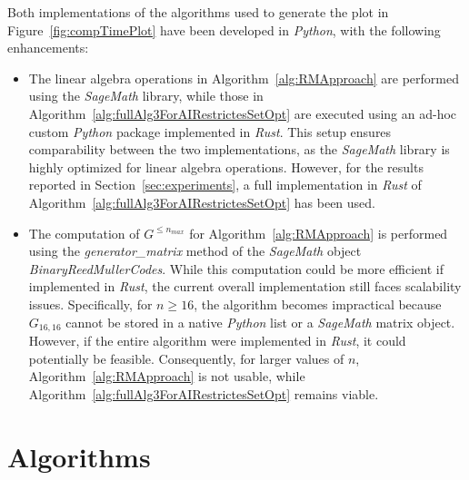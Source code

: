 \documentclass[11pt]{llncs}
\begin{document}
Both implementations of the algorithms used to generate the plot in Figure~\ref{fig:compTimePlot} have been developed in \textit{Python}, with the following enhancements:
\begin{itemize}
\item The linear algebra operations in Algorithm~\ref{alg:RMApproach} are performed using the \textit{SageMath} library, while those in Algorithm~\ref{alg:fullAlg3ForAIRestrictesSetOpt} are executed using an ad-hoc custom \textit{Python} package implemented in \textit{Rust}. This setup ensures comparability between the two implementations, as the \textit{SageMath} library is highly optimized for linear algebra operations. However, for the results reported in Section~\ref{sec:experiments}, a full implementation in \textit{Rust} of Algorithm~\ref{alg:fullAlg3ForAIRestrictesSetOpt} has been used.
\item The computation of $G^{\leq n_{max}}$ for Algorithm~\ref{alg:RMApproach} is performed using the \textit{generator\_matrix} method of the \textit{SageMath} object \textit{BinaryReedMullerCodes}. While this computation could be more efficient if implemented in \textit{Rust}, the current overall implementation still faces scalability issues. Specifically, for $n \geq 16$, the algorithm becomes impractical because $G_{16,16}$ cannot be stored in a native \textit{Python} list or a \textit{SageMath} matrix object. However, if the entire algorithm were implemented in \textit{Rust}, it could potentially be feasible. Consequently, for larger values of $n$, Algorithm~\ref{alg:RMApproach} is not usable, while Algorithm~\ref{alg:fullAlg3ForAIRestrictesSetOpt} remains viable.
\end{itemize}

\setcounter{algorithm}{2} 

\section{Algorithms}\label{Appendix:algorithms}
\end{document}
